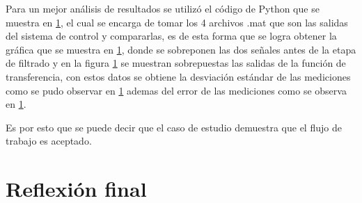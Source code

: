 Para un mejor análisis de resultados se utilizó el código de Python que se muestra en \ref{}, el cual se encarga de tomar los 4 archivos .mat que son las salidas del sistema de control y compararlas, es de esta forma que se logra obtener la gráfica que se muestra en \ref{}, donde se sobreponen las dos señales antes de la etapa de filtrado y en la figura \ref{} se muestran sobrepuestas las salidas de la función de transferencia, con estos datos se obtiene la desviación estándar de las mediciones como se pudo observar en \ref{} ademas del error de las mediciones como se observa en \ref{}.

Es por esto que se puede decir que el caso de estudio demuestra que el flujo de trabajo es aceptado.

\section{Reflexión final}
